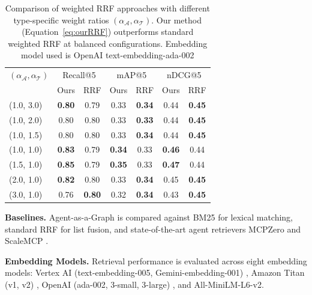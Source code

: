 \documentclass[a4paper,twoside]{article}
\begin{document}
\begin{table}[t]
\caption{Comparison of weighted RRF approaches with different type-specific weight ratios \((\alpha_{\mathcal{A}}, \alpha_{\mathcal{T}})\). Our method (Equation~\ref{eq:ourRRF}) outperforms standard weighted RRF at balanced configurations. Embedding model used is OpenAI text-embedding-ada-002}
\label{tab:results_weighted}
\centering
\begingroup
\small
\setlength{\tabcolsep}{3pt}
\renewcommand{\arraystretch}{1.05} 
\begin{tabular}{l|cc|cc|cc}
\hline
\((\alpha_{\mathcal{A}}, \alpha_{\mathcal{T}})\) & \multicolumn{2}{c|}{Recall@5} & \multicolumn{2}{c|}{mAP@5} & \multicolumn{2}{c}{nDCG@5} \\
 & Ours & RRF & Ours & RRF & Ours & RRF\\
\hline
(1.0, 3.0) & \textbf{0.80} & 0.79 & 0.33 & \textbf{0.34} & 0.44 & \textbf{0.45} \\
(1.0, 2.0) & 0.80          & 0.80 & 0.33 & \textbf{0.33} & 0.44 & \textbf{0.45} \\
(1.0, 1.5) & 0.80          & 0.80 & 0.33 & \textbf{0.34} & 0.44 & \textbf{0.45} \\
(1.0, 1.0) & \textbf{0.83} & 0.79 & \textbf{0.34} & 0.33 & \textbf{0.46} & 0.44 \\
(1.5, 1.0) & \textbf{0.85} & 0.79 & \textbf{0.35} & 0.33 & \textbf{0.47} & 0.44 \\
(2.0, 1.0) & \textbf{0.82} & 0.80 & 0.33 & \textbf{0.34} & 0.45 & \textbf{0.45} \\
(3.0, 1.0) & 0.76 & \textbf{0.80} & 0.32 & \textbf{0.34} & 0.43 & \textbf{0.45} \\
\hline
\end{tabular}
\endgroup
\end{table}

\textbf{Baselines.} Agent-as-a-Graph is compared against BM25 \cite{llamaindex_bm25_retriever} for lexical matching, standard RRF \cite{10.1145/1571941.1572114} for list fusion, and state-of-the-art agent retrievers MCPZero \cite{fei2025mcpzeroactivetooldiscovery} and ScaleMCP \cite{lumer2025scalemcpdynamicautosynchronizingmodel}.



\textbf{Embedding Models.} Retrieval performance is evaluated across eight embedding models: Vertex AI (text-embedding-005, Gemini-embedding-001) \cite{vertex_embedding_models}, Amazon Titan (v1, v2) \cite{titan_embedding_models}, OpenAI (ada-002, 3-small, 3-large) \cite{openai_embedding_models}, and All-MiniLM-L6-v2.
\end{document}
